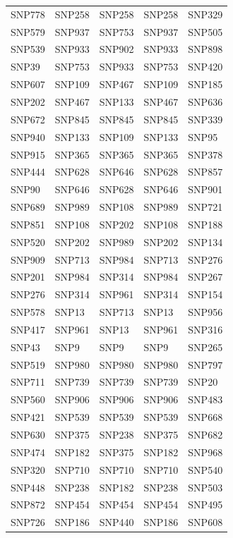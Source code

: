 \begin{table}[ht]
\begin{tabular}{lllll}
  SNP778 & SNP258 & SNP258 & SNP258 & SNP329 \\ 
  SNP579 & SNP937 & SNP753 & SNP937 & SNP505 \\ 
  SNP539 & SNP933 & SNP902 & SNP933 & SNP898 \\ 
  SNP39 & SNP753 & SNP933 & SNP753 & SNP420 \\ 
  SNP607 & SNP109 & SNP467 & SNP109 & SNP185 \\ 
  SNP202 & SNP467 & SNP133 & SNP467 & SNP636 \\ 
  SNP672 & SNP845 & SNP845 & SNP845 & SNP339 \\ 
  SNP940 & SNP133 & SNP109 & SNP133 & SNP95 \\ 
  SNP915 & SNP365 & SNP365 & SNP365 & SNP378 \\ 
  SNP444 & SNP628 & SNP646 & SNP628 & SNP857 \\ 
  SNP90 & SNP646 & SNP628 & SNP646 & SNP901 \\ 
  SNP689 & SNP989 & SNP108 & SNP989 & SNP721 \\ 
  SNP851 & SNP108 & SNP202 & SNP108 & SNP188 \\ 
  SNP520 & SNP202 & SNP989 & SNP202 & SNP134 \\ 
  SNP909 & SNP713 & SNP984 & SNP713 & SNP276 \\ 
  SNP201 & SNP984 & SNP314 & SNP984 & SNP267 \\ 
  SNP276 & SNP314 & SNP961 & SNP314 & SNP154 \\ 
  SNP578 & SNP13 & SNP713 & SNP13 & SNP956 \\ 
  SNP417 & SNP961 & SNP13 & SNP961 & SNP316 \\ 
  SNP43 & SNP9 & SNP9 & SNP9 & SNP265 \\ 
  SNP519 & SNP980 & SNP980 & SNP980 & SNP797 \\ 
  SNP711 & SNP739 & SNP739 & SNP739 & SNP20 \\ 
  SNP560 & SNP906 & SNP906 & SNP906 & SNP483 \\ 
  SNP421 & SNP539 & SNP539 & SNP539 & SNP668 \\ 
  SNP630 & SNP375 & SNP238 & SNP375 & SNP682 \\ 
  SNP474 & SNP182 & SNP375 & SNP182 & SNP968 \\ 
  SNP320 & SNP710 & SNP710 & SNP710 & SNP540 \\ 
  SNP448 & SNP238 & SNP182 & SNP238 & SNP503 \\ 
  SNP872 & SNP454 & SNP454 & SNP454 & SNP495 \\ 
  SNP726 & SNP186 & SNP440 & SNP186 & SNP608 \\ 

\end{tabular}
\end{table}
